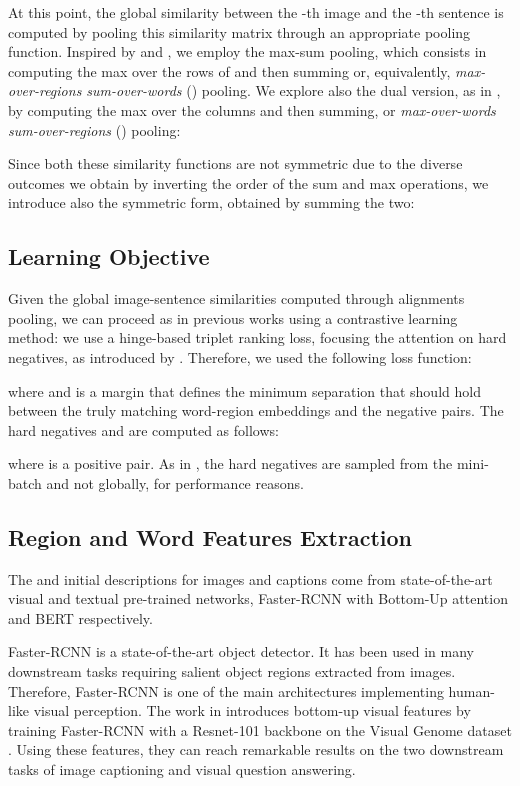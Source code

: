 \documentclass[acmsmall]{acmart}
\begin{document}
At this point, the global similarity  between the -th image and the -th sentence is computed by pooling this similarity matrix through an appropriate pooling function. Inspired by \cite{karpathy2015alignment} and \cite{lee2018stackedcrossattention}, we employ the max-sum pooling, which consists in computing the max over the rows of  and then summing or, equivalently, \textit{max-over-regions sum-over-words} () pooling. We explore also the dual version, as in \cite{lee2018stackedcrossattention}, by computing the max over the columns and then summing, or \textit{max-over-words sum-over-regions} () pooling:



Since both these similarity functions are not symmetric due to the diverse outcomes we obtain by inverting the order of the sum and max operations, we introduce also the symmetric form, obtained by summing the two:


\subsection{Learning Objective}
Given the global image-sentence similarities  computed through alignments pooling, we can proceed as in previous works \cite{vsepp2018faghri,li2019} using a contrastive learning method: we use a hinge-based triplet ranking loss, focusing the attention on hard negatives, as introduced by \cite{vsepp2018faghri}.
Therefore, we used the following loss function:


where  and  is a margin that defines the minimum separation that should hold between the truly matching word-region embeddings and the negative pairs. The hard negatives  and  are computed as follows: 


where  is a positive pair.
As in \cite{vsepp2018faghri}, the hard negatives are sampled from the mini-batch and not globally, for performance reasons.

\subsection{Region and Word Features Extraction}
The  and  initial descriptions for images and captions come from state-of-the-art visual and textual pre-trained networks, Faster-RCNN with Bottom-Up attention and BERT respectively.

Faster-RCNN \cite{RenHGS15fasterrcnn} is a state-of-the-art object detector. It has been used in many downstream tasks requiring salient object regions extracted from images. 
Therefore, Faster-RCNN is one of the main architectures implementing human-like visual perception.
The work in \cite{Anderson2018bottomup} introduces bottom-up visual features by training Faster-RCNN with a Resnet-101 backbone on the Visual Genome dataset \cite{Krishna2016VisualGenome}. Using these features, they can reach remarkable results on the two downstream tasks of image captioning and visual question answering.
\end{document}

